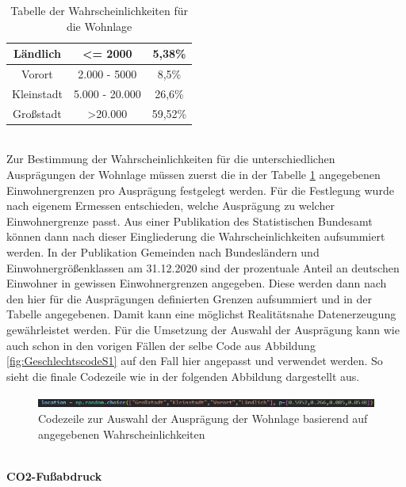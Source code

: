 \begin{onehalfspace}
\begin{table}[!h]
\begin{tabular}{|c|c|c|}
    Ländlich              & \textless{}= 2000        & 5,38\%                      \\ \hline
    Vorort                & 2.000 - 5000             & 8,5\%                       \\ \hline
    Kleinstadt            & 5.000 - 20.000           & 26,6\%                      \\ \hline
    Großstadt             & \textgreater 20.000      & 59,52\%                     \\ \hline
    \end{tabular}
    \caption{Tabelle der Wahrscheinlichkeiten für die Wohnlage}
    \label{table:10}
\end{table}\\
Zur Bestimmung der Wahrscheinlichkeiten für die unterschiedlichen Ausprägungen der Wohnlage müssen zuerst die in der Tabelle \ref{table:10} angegebenen Einwohnergrenzen pro Ausprägung festgelegt werden. Für die Festlegung wurde nach eigenem Ermessen entschieden, welche Ausprägung zu welcher Einwohnergrenze passt. Aus einer Publikation des Statistischen Bundesamt können dann nach dieser Eingliederung die Wahrscheinlichkeiten aufsummiert werden. In der Publikation \glqq{}Gemeinden nach Bundesländern und Einwohnergrößenklassen am 31.12.2020\grqq{} sind der prozentuale Anteil an deutschen Einwohner in gewissen Einwohnergrenzen angegeben. Diese werden dann nach den hier für die Ausprägungen definierten Grenzen aufsummiert und in der Tabelle angegebenen. Damit kann eine möglichst Realitätsnahe Datenerzeugung gewährleistet werden. Für die Umsetzung der Auswahl der Ausprägung kann wie auch schon in den vorigen Fällen der selbe Code aus Abbildung \ref{fig:GeschlechtscodeS1} auf den Fall hier angepasst und verwendet werden. So sieht die finale Codezeile wie in der folgenden Abbildung dargestellt aus.
\begin{figure}[h]
    \centering
    \includegraphics[width=16cm]{Diagramme/Sz2_Auswahl_Lage.JPG}
    \caption{Codezeile zur Auswahl der Ausprägung der Wohnlage basierend auf angegebenen Wahrscheinlichkeiten}
    \label{fig:Sz2AuswahlWohnlage}
\end{figure}\\
\textbf{CO2-Fußabdruck}

\end{onehalfspace}
